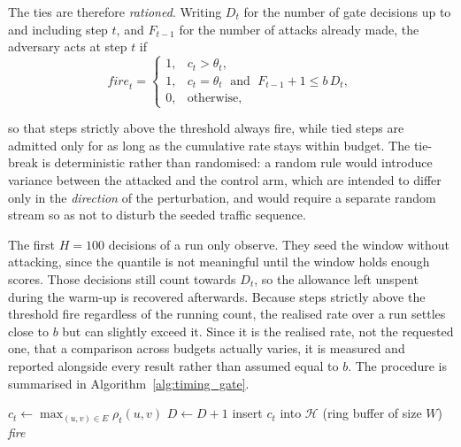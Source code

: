 The ties are therefore \emph{rationed}. Writing $D_t$ for the number of gate decisions
up to and including step $t$, and $F_{t-1}$ for the number of attacks already made,
the adversary acts at step $t$ if
\begin{equation}
  \textit{fire}_t =
  \begin{cases}
    1, & c_t > \theta_t, \\[2pt]
    1, & c_t = \theta_t \;\text{ and }\; F_{t-1} + 1 \le b\,D_t, \\[2pt]
    0, & \text{otherwise,}
  \end{cases}
  \label{eq:timing_rule}
\end{equation}

\noindent so that steps strictly above the threshold always fire, while tied steps
are admitted only for as long as the cumulative rate stays within budget. The
tie-break is deterministic rather than randomised: a random rule would introduce
variance between the attacked and the control arm, which are intended to differ only
in the \emph{direction} of the perturbation, and would require a separate random
stream so as not to disturb the seeded traffic sequence.

The first $H = 100$ decisions of a run only observe. They seed the window without
attacking, since the quantile is not meaningful until the window holds enough scores.
Those decisions still count towards $D_t$, so the allowance left unspent during the
warm-up is recovered afterwards. Because steps strictly above the threshold fire
regardless of the running count, the realised rate over a run settles close to $b$ but
can slightly exceed it. Since it is the realised rate, not the requested one, that a
comparison across budgets actually varies, it is measured and reported alongside every
result rather than assumed equal to $b$. The procedure is summarised in
Algorithm~\ref{alg:timing_gate}.

\begin{algorithm}[H]
\SetAlgoLined
\DontPrintSemicolon
{}
$c_t \leftarrow \max_{(u,v) \in E} \rho_t(u,v)$ 
$D \leftarrow D + 1$\;
insert $c_t$ into $\mathcal{H}$ (ring buffer of size $W$)\;
\Return \textit{fire}\;
\caption{Critical-state timing gate with rationed ties}
\label{alg:timing_gate}
\end{algorithm}

